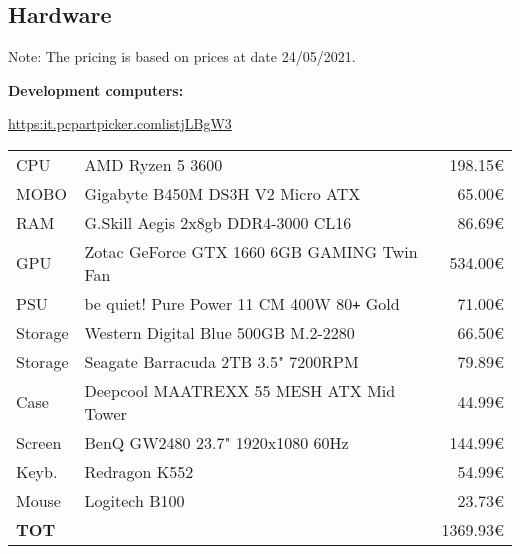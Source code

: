 \subsection{Hardware}
Note: The pricing is based on prices at date 24/05/2021.

\textbf{Development computers:}

\href{https://it.pcpartpicker.com/list/jLBgW3}{https:\/\/it.pcpartpicker.com\/list\/jLBgW3}

\begin{tabular}{|l|l|r|}
	\hline
	CPU      & AMD Ryzen 5 3600                                & 198.15€ \\
	MOBO     & Gigabyte B450M DS3H V2 Micro ATX                &  65.00€ \\
	RAM      & G.Skill Aegis 2x8gb DDR4-3000 CL16              &  86.69€ \\
	GPU      & Zotac GeForce GTX 1660 6GB GAMING Twin Fan      & 534.00€ \\
	PSU      & be quiet! Pure Power 11 CM 400W 80\verb!+! Gold &  71.00€ \\
	Storage  & Western Digital Blue 500GB M.2-2280             &  66.50€ \\
	Storage  & Seagate Barracuda 2TB 3.5" 7200RPM              &  79.89€ \\
	Case     & Deepcool MAATREXX 55 MESH ATX Mid Tower         &  44.99€ \\
	Screen   & BenQ GW2480 23.7" 1920x1080 60Hz                & 144.99€ \\
	Keyb.    & Redragon K552                                   &  54.99€ \\
	Mouse    & Logitech B100                                   &  23.73€ \\
	\hline
	\textbf{TOT} & & 1369.93€ \\
	\hline
\end{tabular}


\pagebreak 
